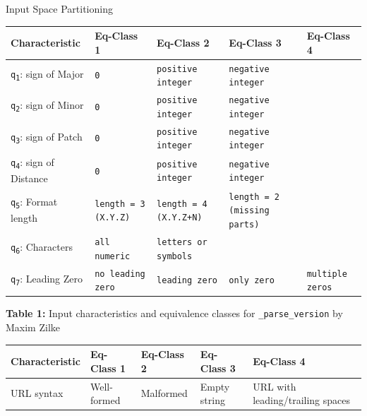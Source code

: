 \documentclass[a4paper]{scrreprt}
\newcounter{question}
\begin{document}
\begin{question}{Input Space Partitioning}
\begin{enumerate}[topsep=0pt, leftmargin=*]
\begin{answer}
            
\vspace{1em}
\centering
\small
\renewcommand{\arraystretch}{1.2}

\begin{tabular}{|p{2.5cm}|p{2.5cm}|p{2.5cm}|p{2.5cm}|p{2.5cm}|}
\hline
\textbf{Characteristic} & \textbf{Eq-Class 1} & \textbf{Eq-Class 2} & \textbf{Eq-Class 3} & \textbf{Eq-Class 4} \\
\hline
\texttt{q\textsubscript{1}}: sign of Major & \texttt{0} & \texttt{positive integer} & \texttt{negative integer} & \\
\hline
\texttt{q\textsubscript{2}}: sign of Minor & \texttt{0} & \texttt{positive integer} & \texttt{negative integer} & \\
\hline
\texttt{q\textsubscript{3}}: sign of Patch & \texttt{0} & \texttt{positive integer} & \texttt{negative integer} & \\
\hline
\texttt{q\textsubscript{4}}: sign of Distance & \texttt{0} & \texttt{positive integer} & \texttt{negative integer} & \\
\hline
\texttt{q\textsubscript{5}}: Format length & \texttt{length = 3 (X.Y.Z)} & \texttt{length = 4 (X.Y.Z+N)} & \texttt{length = 2 (missing parts)} & \\
\hline
\texttt{q\textsubscript{6}}: Characters & \texttt{all numeric} & \texttt{letters or symbols} & & \\
\hline
\texttt{q\textsubscript{7}}: Leading Zero & \texttt{no leading zero} & \texttt{leading zero} & \texttt{only zero} & \texttt{multiple zeros} \\
\hline
\end{tabular}
\vspace{0.5em}
\textbf{Table 1:} Input characteristics and equivalence classes for \texttt{\_parse\_version} by Maxim Zilke
    \begin{table}[H]
    \centering
    \small
    \renewcommand{\arraystretch}{1.2}
    \begin{tabular}{|p{2.5cm}|p{2.5cm}|p{2.5cm}|p{2.5cm}|p{2.5cm}|}
    \hline
    \textbf{Characteristic} & \textbf{Eq-Class 1} & \textbf{Eq-Class 2} & \textbf{Eq-Class 3} & \textbf{Eq-Class 4} \\
    \hline
    URL syntax & Well-formed & Malformed & Empty string & URL with leading/trailing spaces \\

\end{tabular}
\end{table}
\end{answer}
\end{enumerate}
\end{question}
\end{document}
